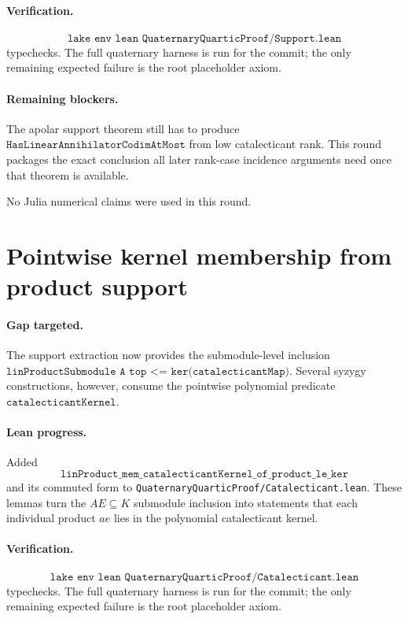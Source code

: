 \documentclass[11pt]{article}
\begin{document}
\paragraph{Verification.}
\[
\texttt{lake env lean QuaternaryQuarticProof/Support.lean}
\]
typechecks.  The full quaternary harness is run for the commit; the only
remaining expected failure is the root placeholder axiom.

\paragraph{Remaining blockers.}
The apolar support theorem still has to produce
\(\texttt{HasLinearAnnihilatorCodimAtMost}\) from low catalecticant rank.  This
round packages the exact conclusion all later rank-case incidence arguments
need once that theorem is available.

No Julia numerical claims were used in this round.

\section*{Pointwise kernel membership from product support}

\paragraph{Gap targeted.}
The support extraction now provides the submodule-level inclusion
\(\texttt{linProductSubmodule A top <= ker(catalecticantMap)}\).  Several
syzygy constructions, however, consume the pointwise polynomial predicate
\(\texttt{catalecticantKernel}\).

\paragraph{Lean progress.}
Added
\[
\texttt{linProduct\_mem\_catalecticantKernel\_of\_product\_le\_ker}
\]
and its commuted form to \texttt{QuaternaryQuarticProof/Catalecticant.lean}.
These lemmas turn the \(AE\subseteq K\) submodule inclusion into statements
that each individual product \(ae\) lies in the polynomial catalecticant
kernel.

\paragraph{Verification.}
\[
\texttt{lake env lean QuaternaryQuarticProof/Catalecticant.lean}
\]
typechecks.  The full quaternary harness is run for the commit; the only
remaining expected failure is the root placeholder axiom.
\end{document}
